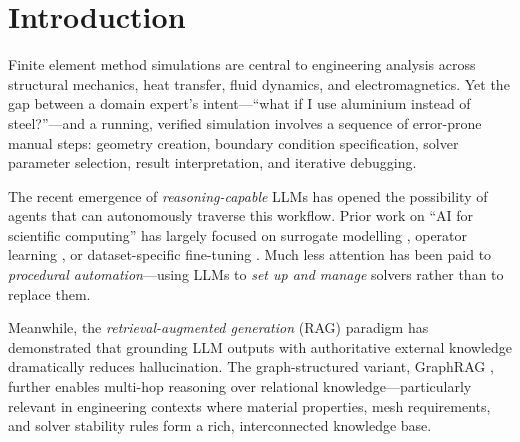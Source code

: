 \documentclass[twocolumn]{article}
\newif\ifrevisionsvisible
\newcommand{\revised}[1]{%
  \ifrevisionsvisible\textcolor{revisionred}{#1}\else#1\fi}
\begin{document}
\begin{abstract}
that selects the optimal retrieval mode per task;
(vi) production-scale agent quality
metrics from 1{,}369 real simulation runs showing 97.8\% overall success
and \revised{an 85.4\%} first-try rate; and (vii) a controlled 100-task KG growth experiment showing
that accumulated run history yields a difficulty-dependent quality
gain, with hard-task MPF improving by 8.8\% between passes while
easy and novel tasks remain at ceiling.  All code, models, and evaluation artifacts
are released openly.  Taken together, these results point to
\emph{integration pattern}, rather than knowledge content, as what
decides whether GraphRAG augmentation helps or hinders an LLM agent, and
they yield concrete design principles for autonomous FEM simulation
assistants.

\smallskip\noindent\textbf{Keywords:} Large language model agents; finite element
method; knowledge graph; GraphRAG; multi-agent systems; scientific computing
automation.
\end{abstract}

\section{Introduction}
\label{sec:intro}

Finite element method simulations are central to engineering analysis across
structural mechanics, heat transfer, fluid dynamics, and electromagnetics.
Yet the gap between a domain expert's intent—``what if I use aluminium instead
of steel?''—and a running, verified simulation involves a sequence of error-prone
manual steps: geometry creation, boundary condition specification, solver
parameter selection, result interpretation, and iterative debugging.

The recent emergence of \emph{reasoning-capable} LLMs \citep{brown2020gpt3,
wei2022cot, yao2023react} has opened the possibility of agents that can
autonomously traverse this workflow.  Prior work on ``AI for scientific
computing'' has largely focused on surrogate modelling
\citep{lagaris1998neural, raissi2019pinn, karniadakis2021physics}, operator
learning \citep{li2021fno}, or dataset-specific fine-tuning
\citep{jumper2021alphafold}.  Much less attention has been paid to
\emph{procedural automation}—using LLMs to \emph{set up and manage} solvers
rather than to replace them.

Meanwhile, the \emph{retrieval-augmented generation} (RAG) paradigm
\citep{lewis2020rag} has demonstrated that grounding LLM outputs with
authoritative external knowledge dramatically reduces hallucination.  The
graph-structured variant, GraphRAG \citep{edge2024graphrag}, further enables
multi-hop reasoning over relational knowledge—particularly relevant in
engineering contexts where material properties, mesh requirements, and solver
stability rules form a rich, interconnected knowledge base.
\end{document}
